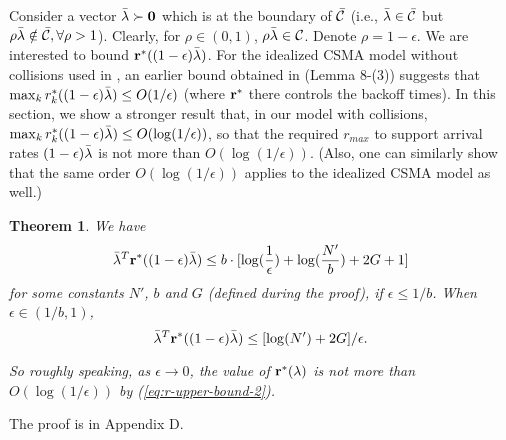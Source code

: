 \documentclass{IEEEtran}
\newtheorem{thm}{Theorem}
\begin{document}
Consider a vector $\bar{{\bf \lambda}}\succ{\bf 0}$ which is at the
boundary of $\bar{{\cal C}}$ (i.e., $\bar{{\bf \lambda}}\in\bar{{\cal C}}$
but $\rho\bar{{\bf \lambda}}\notin\bar{{\cal C}},\forall\rho>1$).
Clearly, for $\rho\in(0,1)$, $\rho\bar{{\bf \lambda}}\in{\cal C}$.
Denote $\rho=1-\epsilon$. We are interested to bound ${\bf r}^{*}((1-\epsilon)\bar{{\bf \lambda}})$.
For the idealized CSMA model without collisions used in \cite{Allerton},
an earlier bound obtained in \cite{joint_work} (Lemma 8-(3)) suggests
that $\max_{k}r_{k}^{*}((1-\epsilon)\bar{{\bf \lambda}})\le O(1/\epsilon)$
(where ${\bf r}^{*}$ there controls the backoff times). In this section,
we show a stronger result that, in our model with collisions, $\max_{k}r_{k}^{*}((1-\epsilon)\bar{{\bf \lambda}})\le O(\log(1/\epsilon))$,
so that the required $r_{max}$ to support arrival rates $(1-\epsilon)\bar{{\bf \lambda}}$
is not more than $O(\log(1/\epsilon))$. (Also, one can similarly
show that the same order $O(\log(1/\epsilon))$ applies to the idealized
CSMA model as well.)
\begin{thm}
\label{thm:collision}We have\begin{equation}
\bar{{\bf \lambda}}^{T}{\bf r}^{*}((1-\epsilon)\bar{{\bf \lambda}})\le b\cdot[\log(\frac{1}{\epsilon})+\log(\frac{N'}{b})+2G+1]\label{eq:r-upper-bound-2}\end{equation}
for some constants $N'$, $b$ and $G$ (defined during the proof),
if $\epsilon\le1/b$. When $\epsilon\in(1/b,1)$, \begin{equation}
\bar{{\bf \lambda}}^{T}{\bf r}^{*}((1-\epsilon)\bar{{\bf \lambda}})\le[\log(N')+2G]/\epsilon.\label{eq:r-upper-bound-3}\end{equation}


So roughly speaking, as $\epsilon\rightarrow0$, the value of ${\bf r}^{*}({\bf \lambda})$
is not more than $O(\log(1/\epsilon))$ by (\ref{eq:r-upper-bound-2}).
\end{thm}
The proof is in Appendix D.
\end{document}
